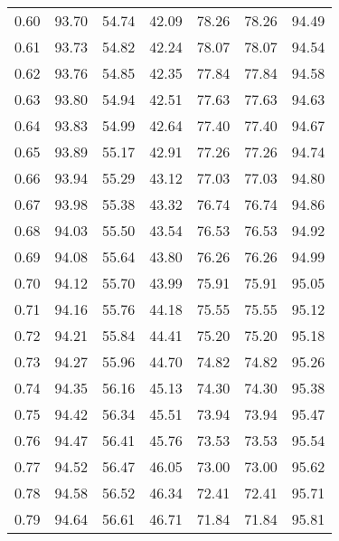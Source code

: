 \begin{tabular}{|c|c|c|c|c|c|c|}
      0.60 &     93.70 &     54.74 &      42.09 &   78.26 &      78.26 &         94.49 \\
      0.61 &     93.73 &     54.82 &      42.24 &   78.07 &      78.07 &         94.54 \\
      0.62 &     93.76 &     54.85 &      42.35 &   77.84 &      77.84 &         94.58 \\
      0.63 &     93.80 &     54.94 &      42.51 &   77.63 &      77.63 &         94.63 \\
      0.64 &     93.83 &     54.99 &      42.64 &   77.40 &      77.40 &         94.67 \\
      0.65 &     93.89 &     55.17 &      42.91 &   77.26 &      77.26 &         94.74 \\
      0.66 &     93.94 &     55.29 &      43.12 &   77.03 &      77.03 &         94.80 \\
      0.67 &     93.98 &     55.38 &      43.32 &   76.74 &      76.74 &         94.86 \\
      0.68 &     94.03 &     55.50 &      43.54 &   76.53 &      76.53 &         94.92 \\
      0.69 &     94.08 &     55.64 &      43.80 &   76.26 &      76.26 &         94.99 \\
      0.70 &     94.12 &     55.70 &      43.99 &   75.91 &      75.91 &         95.05 \\
      0.71 &     94.16 &     55.76 &      44.18 &   75.55 &      75.55 &         95.12 \\
      0.72 &     94.21 &     55.84 &      44.41 &   75.20 &      75.20 &         95.18 \\
      0.73 &     94.27 &     55.96 &      44.70 &   74.82 &      74.82 &         95.26 \\
      0.74 &     94.35 &     56.16 &      45.13 &   74.30 &      74.30 &         95.38 \\
      0.75 &     94.42 &     56.34 &      45.51 &   73.94 &      73.94 &         95.47 \\
      0.76 &     94.47 &     56.41 &      45.76 &   73.53 &      73.53 &         95.54 \\
      0.77 &     94.52 &     56.47 &      46.05 &   73.00 &      73.00 &         95.62 \\
      0.78 &     94.58 &     56.52 &      46.34 &   72.41 &      72.41 &         95.71 \\
      0.79 &     94.64 &     56.61 &      46.71 &   71.84 &      71.84 &         95.81 \\

\end{tabular}
